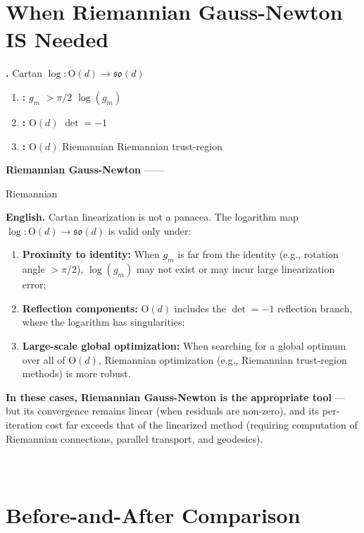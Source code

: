 \documentclass[11pt,a4paper]{article}
\theoremstyle{plain}
\theoremstyle{definition}
\theoremstyle{remark}
\newcommand{\so}{\mathfrak{so}}
\begin{document}
\section*{When Riemannian Gauss-Newton IS Needed}

\noindent
\textbf{.}
Cartan  $\log: \mathrm{O}(d) \to \so(d)$ 


\begin{enumerate}[label=(\arabic*)]
  \item \textbf{:}  $g_m$  $> \pi/2$
        $\log(g_m)$ 
  \item \textbf{:} $\mathrm{O}(d)$  $\det = -1$ 
        
  \item \textbf{:}  $\mathrm{O}(d)$ 
        Riemannian  Riemannian trust-region 
\end{enumerate}

\textbf{Riemannian Gauss-Newton }——

 Riemannian 

\medskip
\noindent
\textbf{English.}
Cartan linearization is not a panacea. The logarithm map
$\log: \mathrm{O}(d) \to \so(d)$ is valid only under:

\begin{enumerate}[label=(\arabic*)]
  \item \textbf{Proximity to identity:} When $g_m$ is far from the identity
        (e.g., rotation angle $> \pi/2$), $\log(g_m)$ may not exist or may
        incur large linearization error;
  \item \textbf{Reflection components:} $\mathrm{O}(d)$ includes the
        $\det = -1$ reflection branch, where the logarithm has singularities;
  \item \textbf{Large-scale global optimization:} When searching for a global
        optimum over all of $\mathrm{O}(d)$, Riemannian optimization (e.g.,
        Riemannian trust-region methods) is more robust.
\end{enumerate}

\textbf{In these cases, Riemannian Gauss-Newton is the appropriate tool} —
but its convergence remains linear (when residuals are non-zero),
and its per-iteration cost far exceeds that of the linearized method
(requiring computation of Riemannian connections, parallel transport,
and geodesics).

\section{ \\ Before-and-After Comparison}
\end{document}
